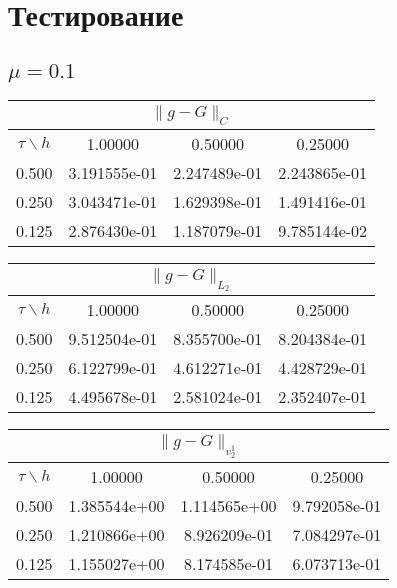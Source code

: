 \section{Тестирование}

\subsection{$\mu=0.1$}
\begin{center}
\begin{tabular}{||c|c|c|c||}
\hline
\hline
\multicolumn{4}{||c||}{$\|g-G\| _{C}$}\\ 
\hline
\hline
$\tau \backslash h$ & 1.00000 & 0.50000 & 0.25000\\ 
\hline
0.500& 3.191555e-01 &2.247489e-01 &2.243865e-01 \\
\hline
0.250& 3.043471e-01 &1.629398e-01 &1.491416e-01 \\
\hline
0.125& 2.876430e-01 &1.187079e-01 &9.785144e-02 \\
\hline
\hline
\end{tabular}
\end{center}
\begin{center}
\begin{tabular}{||c|c|c|c||}
\hline
\hline
\multicolumn{4}{||c||}{$\|g-G\| _{L_2}$}\\ 
\hline
\hline
$\tau \backslash h$ & 1.00000 & 0.50000 & 0.25000\\ 
\hline
0.500& 9.512504e-01 &8.355700e-01 &8.204384e-01 \\ 
\hline
0.250& 6.122799e-01 &4.612271e-01 &4.428729e-01 \\
\hline
0.125& 4.495678e-01 &2.581024e-01 &2.352407e-01 \\
\hline
\hline
\end{tabular}
\end{center}
\begin{center}
\begin{tabular}{||c|c|c|c||}
\hline
\hline
\multicolumn{4}{||c||}{$\|g-G\| _{v_2^1}$}\\ 
\hline
\hline
$\tau \backslash h$ & 1.00000 & 0.50000 & 0.25000\\ 
\hline 
0.500& 1.385544e+00 &1.114565e+00 &9.792058e-01 \\ 
\hline
0.250& 1.210866e+00 &8.926209e-01 &7.084297e-01 \\ 
\hline
0.125& 1.155027e+00 &8.174585e-01 &6.073713e-01 \\ 
\hline
\hline
\end{tabular}
\end{center}
